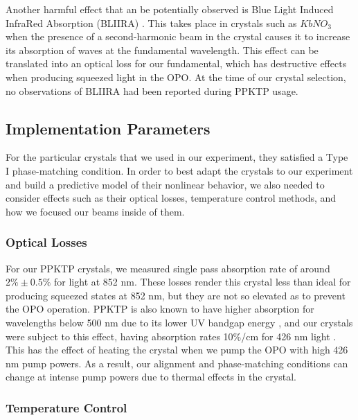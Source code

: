 Another harmful effect that an be potentially observed is Blue Light Induced InfraRed Absorption (BLIIRA) \cite{Mabuchi:94}.  This takes place in crystals such as $KbNO_3$ when the presence of a second-harmonic beam in the crystal causes it to increase its absorption of waves at the fundamental wavelength.  This effect can be translated into an optical loss for our fundamental, which has destructive effects when producing squeezed light in the OPO.  At the time of our crystal selection, no observations of BLIIRA had been reported during PPKTP usage.




\subsection{Implementation Parameters} 

For the particular crystals that we used in our experiment, they satisfied a Type I phase-matching condition.  In order to best adapt the crystals to our experiment and build a predictive model of their nonlinear behavior, we also needed to consider effects such as their optical losses, temperature control methods, and how we focused our beams inside of them.


\subsubsection{Optical Losses}
\label{optical_losses} 

For our PPKTP crystals, we measured single pass absorption rate of around $2\% \pm 0.5\%$ for light at 852 nm.  These losses render this crystal less than ideal for producing squeezed states at 852 nm, but they are not so elevated as to prevent the OPO operation.  PPKTP is also known to have higher absorption for wavelengths below 500 nm due to its lower UV bandgap energy \cite{letargat2005}, and our crystals were subject to this effect, having absorption rates 10\%/cm for 426 nm light \cite{Hansson00}.  This has the effect of heating the crystal when we pump the OPO with high 426 nm pump powers.  As a result, our alignment and phase-matching conditions can change at intense pump powers due to thermal effects in the crystal.


\subsubsection{Temperature Control}
\label{temperature_control} 

